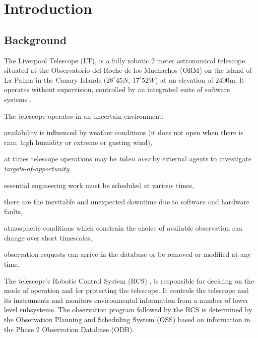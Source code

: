 \section{Introduction}
\label{sect:intro}

\subsection{Background}
\label{sect:intro_background}
The Liverpool Telescope (LT),\citep{steele04liverpool} is a fully robotic 2 meter astronomical telescope situated at the Observatorio del Roche de los Muchachos (ORM) on the island of La Palma in the Canary Islands ($28^{\circ}45N$, $17^{\circ}52W$) at an elevation of 2400m. It operates without supervision, controlled by an integrated suite of software systems \citep{steele97control}. 

The telescope operates in an uncertain environment:- \begin{inparaenum} \item availability is influenced by weather conditions (it does not open when there is rain, high humidity or extreme or gusting wind), \item at times telescope operations may be \emph{taken over} by external agents \citep{mottram06high, allan04estar} to investigate \emph{targets-of-opportunity}, \item essential engineering work must be scheduled at various times, \item there are the inevitable and unexpected downtime due to software and hardware faults, \item atmospheric conditions which constrain the choice of available observation can change over short timescales, \item observation requests can arrive in the database or be removed or modified at any time.\end{inparaenum}

The telescope's Robotic Control System (RCS) \citep{fraser02robotic}, is responsible  for deciding on the mode of operation and for protecting the telescope. It controls the telescope and its instruments and monitors environmental information from a number of lower level subsystems. The observation program followed by the RCS is determined by the Observation Planning and Scheduling System (OSS) based on information in the Phase 2 Observation Database (ODB).

